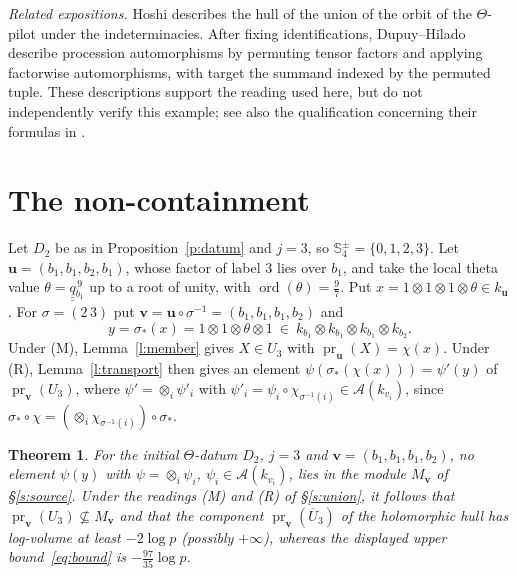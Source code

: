 \documentclass[11pt]{amsart}
\newtheorem{theorem}{Theorem}
\theoremstyle{remark}
\newcommand{\cA}{\mathcal A}
\newcommand{\qq}{\underline{\underline{q}}{}}
\newcommand{\pr}{\operatorname{pr}}
\newcommand{\bv}{\mathbf v}
\newcommand{\bu}{\mathbf u}
\begin{document}
\smallskip
\noindent\emph{Related expositions.}
Hoshi \cite[\S25, p.~93 of the author's version]{HoshiII} describes the hull of the
union of the orbit of the $\Theta$-pilot under the indeterminacies.
After fixing identifications, Dupuy--Hilado \cite[\S4.6, pp.~19--20]{DH1}
describe procession automorphisms by permuting tensor factors and applying factorwise
automorphisms, with target the summand indexed by the permuted tuple.
These descriptions support the reading used here, but do not independently verify this example;
see also the qualification concerning their formulas in \cite[Rem.~4.10.1]{DH1}.

\section{The non-containment}\label{s:main}

Let $D_2$ be as in Proposition~\ref{p:datum} and $j=3$, so $\mathbb S^\pm_4=\{0,1,2,3\}$. Let
$\bu=(b_1,b_1,b_2,b_1)$, whose factor of label $3$ lies over $b_1$, and take the local theta value
$\theta=\qq_{b_1}^{\,9}$ up to a root of unity, with $\operatorname{ord}(\theta)=\tfrac97$.
Put $x=1\otimes1\otimes1\otimes\theta\in k_{\bu}$.
For $\sigma=(2\,3)$ put $\bv=\bu\circ\sigma^{-1}=(b_1,b_1,b_1,b_2)$ and
\[
y=\sigma_*(x)=1\otimes1\otimes\theta\otimes1\ \in\ k_{b_1}\otimes k_{b_1}\otimes k_{b_1}\otimes k_{b_2}.
\]
Under \textup{(M)}, Lemma~\ref{l:member} gives $X\in U_3$ with $\pr_{\bu}(X)=\chi(x)$.
Under \textup{(R)}, Lemma~\ref{l:transport} then gives an element $\psi(\sigma_*(\chi(x)))=\psi'(y)$ of $\pr_{\bv}(U_3)$, where
$\psi'=\otimes_i\psi'_i$ with $\psi'_i=\psi_i\circ\chi_{\sigma^{-1}(i)}\in\cA(k_{v_i})$, since
$\sigma_*\circ\chi=(\otimes_i\chi_{\sigma^{-1}(i)})\circ\sigma_*$.

\begin{theorem}\label{t:main}
For the initial $\Theta$-datum $D_2$, $j=3$ and $\bv=(b_1,b_1,b_1,b_2)$, no element
$\psi(y)$ with $\psi=\otimes_i\psi_i$, $\psi_i\in\cA(k_{v_i})$, lies in the module
$M_{\bv}$ of \S\ref{s:source}.
Under the readings \textup{(M)} and \textup{(R)} of \S\ref{s:union}, it follows that
$\pr_{\bv}(U_3)\not\subseteq M_{\bv}$ and that the component
$\pr_{\bv}(\overline U_3)$ of the holomorphic hull has log-volume at least $-2\log p$
(possibly $+\infty$), whereas the displayed upper bound~\eqref{eq:bound} is
$-\tfrac{97}{35}\log p$.
\end{theorem}
\end{document}
